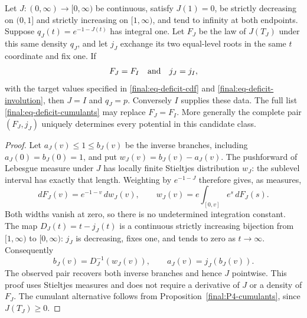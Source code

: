 \begin{theorem}
\label{final:P4}
Let $J:(0,\infty)\to[0,\infty)$ be continuous, satisfy $J(1)=0$,
be strictly decreasing on $(0,1]$ and strictly increasing on
$[1,\infty)$, and tend to infinity at both endpoints.  Suppose
$q_J(t)=e^{-1-J(t)}$ has integral one.  Let $F_J$ be the law of
$J(T_J)$ under this same density $q_J$, and let $j_J$ exchange its
two equal-level roots in the same $t$ coordinate and fix one.
If
\[
 F_J=F_I\quad\hbox{and}\quad j_J=j_I,
\]
with the target values specified in
\eqref{final:eq-deficit-cdf} and \eqref{final:eq-deficit-involution},
then $J=I$ and $q_J=p$.  Conversely $I$ supplies these data.
The full list \eqref{final:eq-deficit-cumulants} may replace $F_J=F_I$.
More generally the complete pair $(F_J,j_J)$ uniquely determines
every potential in this candidate class.
\end{theorem}
\begin{proof}
Let $a_J(v)\leq1\leq b_J(v)$ be the inverse branches, including
$a_J(0)=b_J(0)=1$, and put $w_J(v)=b_J(v)-a_J(v)$.
The pushforward of Lebesgue measure under $J$ has locally finite
Stieltjes distribution $w_J$: the sublevel interval has exactly
that length.  Weighting by $e^{-1-J}$ therefore gives, as measures,
\[
 dF_J(v)=e^{-1-v}\,dw_J(v),\qquad
 w_J(v)=e\int_{[0,v]}e^s\,dF_J(s).
\]
Both widths vanish at zero, so there is no undetermined integration
constant.  The map $D_J(t)=t-j_J(t)$ is a continuous strictly
increasing bijection from $[1,\infty)$ to $[0,\infty)$:
$j_J$ is decreasing, fixes one, and tends to zero as $t\to\infty$.
Consequently
\[
 b_J(v)=D_J^{-1}(w_J(v)),\qquad a_J(v)=j_J(b_J(v)).
\]
The observed pair recovers both inverse branches and hence $J$
pointwise.  This proof uses Stieltjes measures and does not require
a derivative of $J$ or a density of $F_J$.
The cumulant alternative follows from
Proposition~\ref{final:P4-cumulants}, since $J(T_J)\geq0$.
\end{proof}

